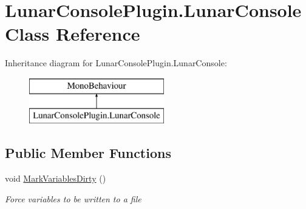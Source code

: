 \hypertarget{class_lunar_console_plugin_1_1_lunar_console}{}\section{Lunar\+Console\+Plugin.\+Lunar\+Console Class Reference}
\label{class_lunar_console_plugin_1_1_lunar_console}
Inheritance diagram for Lunar\+Console\+Plugin.\+Lunar\+Console\+:\begin{figure}[H]
\begin{center}
\leavevmode
\includegraphics[height=2.000000cm]{class_lunar_console_plugin_1_1_lunar_console}
\end{center}
\end{figure}
\subsection*{Public Member Functions}
\begin{DoxyCompactItemize}
\item 
void \mbox{\hyperlink{class_lunar_console_plugin_1_1_lunar_console_ae51760319ad0c8d63c50e62e45497395}{Mark\+Variables\+Dirty}} ()
\begin{DoxyCompactList}\small\item\em Force variables to be written to a file \end{DoxyCompactList}\end{DoxyCompactItemize}
